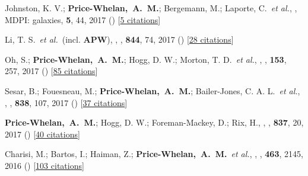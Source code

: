 \item[{\color{deemph}\scriptsize28}]Johnston, K. V.; \textbf{Price-Whelan,~A.~M.}; Bergemann, M.; Laporte, C.~\textit{et al.}, , MDPI: galaxies, \textbf{5}, 44, 2017 () [\href{http://adsabs.harvard.edu/abs/2017Galax...5...44J}{5 citations}]

\item[{\color{deemph}\scriptsize27}]Li, T. S.~\textit{et al.}~(incl. \textbf{APW}), , \apj, \textbf{844}, 74, 2017 () [\href{http://adsabs.harvard.edu/abs/2017ApJ...844...74L}{28 citations}]

\item[{\color{deemph}\scriptsize26}]Oh, S.; \textbf{Price-Whelan,~A.~M.}; Hogg, D. W.; Morton, T. D.~\textit{et al.}, , \aj, \textbf{153}, 257, 2017 () [\href{http://adsabs.harvard.edu/abs/2017AJ....153..257O}{85 citations}]

\item[{\color{deemph}\scriptsize25}]Sesar, B.; Fouesneau, M.; \textbf{Price-Whelan,~A.~M.}; Bailer-Jones, C. A. L.~\textit{et al.}, , \apj, \textbf{838}, 107, 2017 () [\href{http://adsabs.harvard.edu/abs/2017ApJ...838..107S}{37 citations}]

\item[{\color{deemph}\scriptsize24}]\textbf{Price-Whelan,~A.~M.}; Hogg, D. W.; Foreman-Mackey, D.; Rix, H., , \apj, \textbf{837}, 20, 2017 () [\href{http://adsabs.harvard.edu/abs/2017ApJ...837...20P}{40 citations}]

\item[{\color{deemph}\scriptsize23}]Charisi, M.; Bartos, I.; Haiman, Z.; \textbf{Price-Whelan,~A.~M.}~\textit{et al.}, , \mnras, \textbf{463}, 2145, 2016 () [\href{http://adsabs.harvard.edu/abs/2016MNRAS.463.2145C}{103 citations}]

